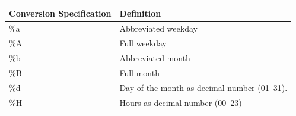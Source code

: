 \documentclass[]{book}
\begin{document}
\begin{longtable}[]{@{}ll@{}}
\toprule
\begin{minipage}[b]{0.34\columnwidth}\raggedright\strut
Conversion Specification\strut
\end{minipage} & \begin{minipage}[b]{0.48\columnwidth}\raggedright\strut
Definition\strut
\end{minipage}\tabularnewline
\midrule
\endhead
\begin{minipage}[t]{0.34\columnwidth}\raggedright\strut
\%a\strut
\end{minipage} & \begin{minipage}[t]{0.48\columnwidth}\raggedright\strut
Abbreviated weekday\strut
\end{minipage}\tabularnewline
\begin{minipage}[t]{0.34\columnwidth}\raggedright\strut
\%A\strut
\end{minipage} & \begin{minipage}[t]{0.48\columnwidth}\raggedright\strut
Full weekday\strut
\end{minipage}\tabularnewline
\begin{minipage}[t]{0.34\columnwidth}\raggedright\strut
\%b\strut
\end{minipage} & \begin{minipage}[t]{0.48\columnwidth}\raggedright\strut
Abbreviated month\strut
\end{minipage}\tabularnewline
\begin{minipage}[t]{0.34\columnwidth}\raggedright\strut
\%B\strut
\end{minipage} & \begin{minipage}[t]{0.48\columnwidth}\raggedright\strut
Full month\strut
\end{minipage}\tabularnewline
\begin{minipage}[t]{0.34\columnwidth}\raggedright\strut
\%d\strut
\end{minipage} & \begin{minipage}[t]{0.48\columnwidth}\raggedright\strut
Day of the month as decimal number (01--31).\strut
\end{minipage}\tabularnewline
\begin{minipage}[t]{0.34\columnwidth}\raggedright\strut
\%H\strut
\end{minipage} & \begin{minipage}[t]{0.48\columnwidth}\raggedright\strut
Hours as decimal number (00--23)\strut
\end{minipage}\tabularnewline

\end{longtable}
\end{document}
